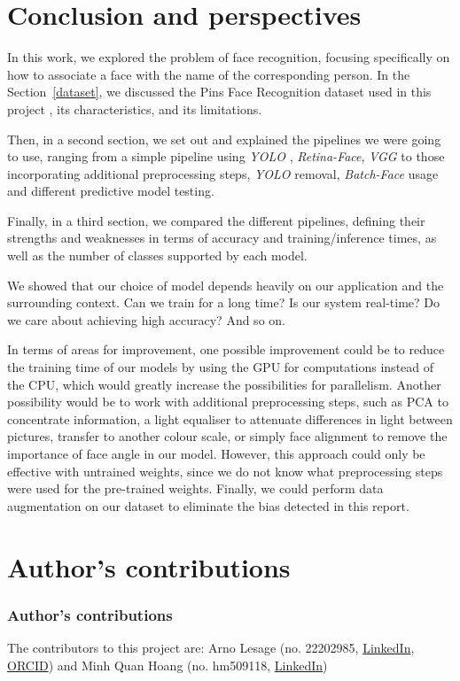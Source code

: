 \documentclass[9pt,twocolumn,twoside]{ilcss}
\theoremstyle{definition}
\theoremstyle{remark}
\theoremstyle{definition}
\theoremstyle{definition}
\begin{document}
\section*{Conclusion and perspectives}

    In this work, we explored the problem of face recognition, focusing specifically on how to associate a face with the name of the corresponding person. 
    In the Section~\ref{dataset}, we discussed the Pins Face Recognition dataset used in this project \cite{PinFaces105Burak}, its characteristics, and its limitations.

    Then, in a second section, we set out and explained the pipelines we were going to use, ranging from a simple pipeline using \textit{YOLO} \cite{yolo11_ultralytics}, \textit{Retina-Face}, \textit{VGG} \cite{VGGFaceDescriptor} to those incorporating additional preprocessing steps, \textit{YOLO} removal, \textit{Batch-Face} usage and different predictive model testing.

    Finally, in a third section, we compared the different pipelines, defining their strengths and weaknesses in terms of accuracy and training/inference times, as well as the number of classes supported by each model. 

    We showed that our choice of model depends heavily on our application and the surrounding context. Can we train for a long time? Is our system real-time? Do we care about achieving high accuracy? And so on.

    In terms of areas for improvement, one possible improvement could be to reduce the training time of our models by using the GPU for computations instead of the CPU, which would greatly increase the possibilities for parallelism. Another possibility would be to work with additional preprocessing steps, such as PCA to concentrate information, a light equaliser to attenuate differences in light between pictures, transfer to another colour scale, or simply face alignment to remove the importance of face angle in our model. However, this approach could only be effective with untrained weights, since we do not know what preprocessing steps were used for the pre-trained weights. Finally, we could perform data augmentation on our dataset to eliminate the bias detected in this report. 

\section*{Author's contributions}
    \subsubsection*{Author's contributions}
    The contributors to this project are: Arno Lesage (no. 22202985, \href{https://www.linkedin.com/in/arnolesage/}{LinkedIn}, \href{https://orcid.org/0009-0004-6738-9150}{ORCID}) and Minh Quan Hoang (no. hm509118, \href{https://www.linkedin.com/in/minh-quan-hoang-9308bb173/}{LinkedIn})
\end{document}
